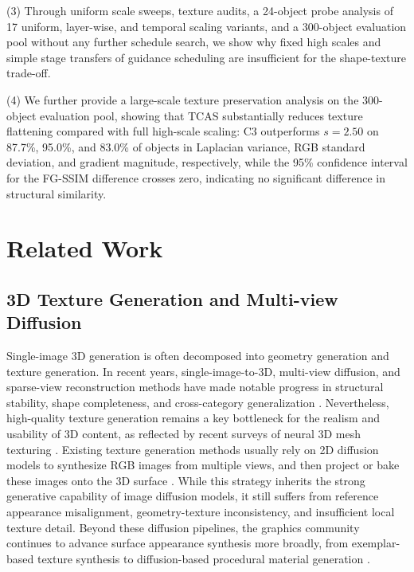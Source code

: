 \documentclass[times,twocolumn,final]{elsarticle}
\begin{document}
(3) Through uniform scale sweeps, texture audits, a 24-object probe analysis of 17 uniform, layer-wise, and temporal scaling variants, and a 300-object evaluation pool without any further schedule search, we show why fixed high scales and simple stage transfers of guidance scheduling are insufficient for the shape-texture trade-off.

(4) We further provide a large-scale texture preservation analysis on the 300-object evaluation pool, showing that TCAS substantially reduces texture flattening compared with full high-scale scaling: C3 outperforms $s = 2.50$ on 87.7\%, 95.0\%, and 83.0\% of objects in Laplacian variance, RGB standard deviation, and gradient magnitude, respectively, while the 95\% confidence interval for the FG-SSIM difference crosses zero, indicating no significant difference in structural similarity.

\section{Related Work}
\label{sec:related}

\subsection{3D Texture Generation and Multi-view Diffusion}
\label{subsec:3dtex}

Single-image 3D generation is often decomposed into geometry generation and texture generation. In recent years, single-image-to-3D, multi-view diffusion, and sparse-view reconstruction methods have made notable progress in structural stability, shape completeness, and cross-category generalization \cite{liu2023zero1to3,shi2023zero123pp,liu2023syncdreamer,long2023wonder3d,shi2024mvdream,wang2023imagedream,xu2024instantmesh,ke2024era3d}. Nevertheless, high-quality texture generation remains a key bottleneck for the realism and usability of 3D content, as reflected by recent surveys of neural 3D mesh texturing \cite{perla2026survey}. Existing texture generation methods usually rely on 2D diffusion models to synthesize RGB images from multiple views, and then project or bake these images onto the 3D surface \cite{chen2023text2tex,richardson2023texture,poole2023dreamfusion,chen2023fantasia3d}. While this strategy inherits the strong generative capability of image diffusion models, it still suffers from reference appearance misalignment, geometry-texture inconsistency, and insufficient local texture detail. Beyond these diffusion pipelines, the graphics community continues to advance surface appearance synthesis more broadly, from exemplar-based texture synthesis \cite{guzman2026adaptive} to diffusion-based procedural material generation \cite{lv2025interpretable}.
\end{document}
